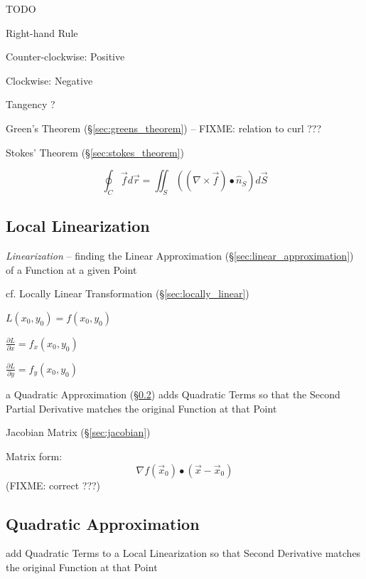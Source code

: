{TODO

Right-hand Rule

Counter-clockwise: Positive

Clockwise: Negative

Tangency ?

Green's Theorem (\S\ref{sec:greens_theorem}) -- FIXME: relation to curl ???

Stokes' Theorem (\S\ref{sec:stokes_theorem})

\[
  \oint_C \vec{f} d\vec{r}
    = \iint_S ((\nabla \times \vec{f}) \bullet \hat{n}_S) d\vec{S}
\]



\subsection{Local Linearization}\label{sec:linearization}

\emph{Linearization} -- finding the Linear Approximation
(\S\ref{sec:linear_approximation}) of a Function at a given Point

\fist cf. Locally Linear Transformation (\S\ref{sec:locally_linear})

$L(x_0,y_0) = f(x_0,y_0)$

$\frac{\partial{L}}{\partial{x}} = f_x(x_0,y_0)$

$\frac{\partial{L}}{\partial{y}} = f_y(x_0,y_0)$

a Quadratic Approximation (\S\ref{sec:quadratic_approximation}) adds Quadratic
Terms so that the Second Partial Derivative matches the original Function at
that Point

\fist Jacobian Matrix (\S\ref{sec:jacobian})

Matrix form:
\[
  \nabla f(\vec{x}_0) \bullet (\vec{x}-\vec{x}_0)
\]
(FIXME: correct ???)



\subsection{Quadratic Approximation}\label{sec:quadratic_approximation}

add Quadratic Terms to a Local Linearization so that Second Derivative matches
the original Function at that Point

}
